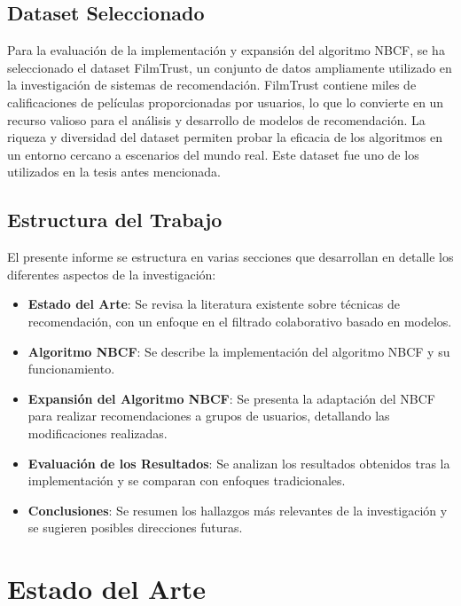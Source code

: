 \documentclass[twocolumn, fontsize=10pt]{article}
\begin{document}
\subsection{Dataset Seleccionado}

Para la evaluación de la implementación y expansión 
del algoritmo NBCF, se ha seleccionado el dataset 
FilmTrust\cite{filmtrust}, un conjunto de datos ampliamente utilizado 
en la investigación de sistemas de recomendación. 
FilmTrust contiene miles de calificaciones de 
películas proporcionadas por usuarios, lo que lo 
convierte en un recurso valioso para el análisis y 
desarrollo de modelos de recomendación. 
La riqueza y diversidad del dataset permiten probar 
la eficacia de los algoritmos en un entorno 
cercano a escenarios del mundo real. 
Este dataset fue uno de los utilizados en la tesis antes mencionada.

\subsection{Estructura del Trabajo}

El presente informe se estructura en varias secciones 
que desarrollan en detalle los diferentes aspectos de 
la investigación:

\begin{itemize} 
    \item \textbf{Estado del Arte}: Se revisa la literatura existente sobre técnicas de recomendación, con un enfoque en el filtrado colaborativo basado en modelos. 
    \item \textbf{Algoritmo NBCF}: Se describe la implementación del algoritmo NBCF y su funcionamiento. 
    \item \textbf{Expansión del Algoritmo NBCF}: Se presenta la adaptación del NBCF para realizar recomendaciones a grupos de usuarios, detallando las modificaciones realizadas. 
    \item \textbf{Evaluación de los Resultados}: Se analizan los resultados obtenidos tras la implementación y se comparan con enfoques tradicionales. 
    \item \textbf{Conclusiones}: Se resumen los hallazgos más relevantes de la investigación y se sugieren posibles direcciones futuras. 
\end{itemize}

\section{Estado del Arte}
\end{document}
